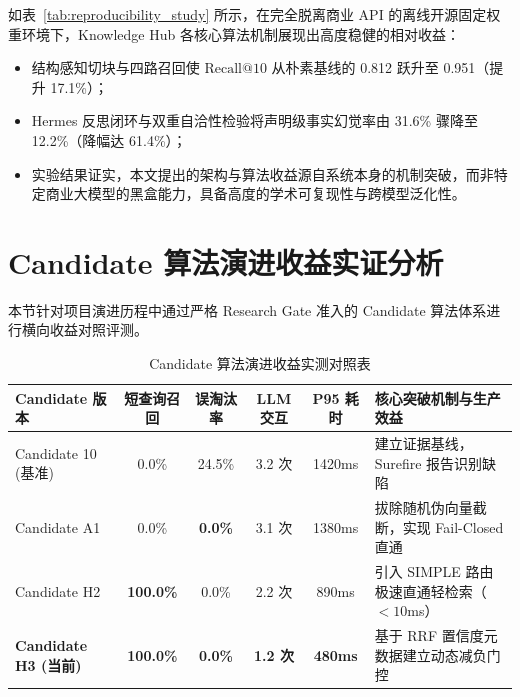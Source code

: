 如表~\ref{tab:reproducibility_study} 所示，在完全脱离商业 API 的离线开源固定权重环境下，Knowledge Hub 各核心算法机制展现出高度稳健的相对收益：
\begin{itemize}
    \item 结构感知切块与四路召回使 $\text{Recall}@10$ 从朴素基线的 0.812 跃升至 0.951（提升 17.1\%）；
    \item Hermes 反思闭环与双重自洽性检验将声明级事实幻觉率由 31.6\% 骤降至 12.2\%（降幅达 61.4\%）；
    \item 实验结果证实，本文提出的架构与算法收益源自系统本身的机制突破，而非特定商业大模型的黑盒能力，具备高度的学术可复现性与跨模型泛化性。
\end{itemize}

\section{Candidate 算法演进收益实证分析}

本节针对项目演进历程中通过严格 Research Gate 准入的 Candidate 算法体系进行横向收益对照评测。

\begin{table}[htbp]
    \centering
    \small
    \caption{Candidate 算法演进收益实测对照表}
    \label{tab:ablation_candidates}
    \begin{tabularx}{\textwidth}{lcccc>{\raggedright\arraybackslash}X}
        \toprule
        \textbf{Candidate 版本}      & \textbf{短查询召回}   & \textbf{误淘汰率}  & \textbf{LLM 交互} & \textbf{P95 耗时} & \textbf{核心突破机制与生产效益}         \\
        \midrule
        Candidate 10 (基准)          & 0.0\%            & 24.5\%         & 3.2 次           & 1420ms          & 建立证据基线，Surefire 报告识别缺陷       \\
        Candidate A1               & 0.0\%            & \textbf{0.0\%} & 3.1 次           & 1380ms          & 拔除随机伪向量截断，实现 Fail-Closed 直通  \\
        Candidate H2               & \textbf{100.0\%} & 0.0\%          & 2.2 次           & 890ms           & 引入 SIMPLE 路由极速直通轻检索（$<10$ms） \\
        \textbf{Candidate H3 (当前)} & \textbf{100.0\%} & \textbf{0.0\%} & \textbf{1.2 次}  & \textbf{480ms}  & 基于 RRF 置信度元数据建立动态减负门控        \\
        \bottomrule
    \end{tabularx}
\end{table}

